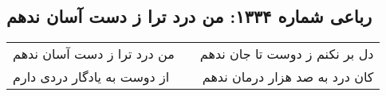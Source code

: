\begin{center}
\section*{رباعی شماره ۱۳۳۴: من درد ترا ز دست آسان ندهم}
\label{sec:1334}
\begin{longtable}{l p{0.5cm} r}
من درد ترا ز دست آسان ندهم
&&
دل بر نکنم ز دوست تا جان ندهم
\\
از دوست به یادگار دردی دارم
&&
کان درد به صد هزار درمان ندهم
\\
\end{longtable}
\end{center}
